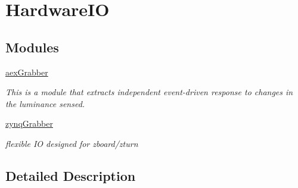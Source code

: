 \hypertarget{group__HardwareIO}{\section{Hardware\-I\-O}
\label{group__HardwareIO}
}
\subsection*{Modules}
\begin{DoxyCompactItemize}
\item 
\hyperlink{group__aexGrabber}{aex\-Grabber}
\begin{DoxyCompactList}\small\item\em This is a module that extracts independent event-\/driven response to changes in the luminance sensed. \end{DoxyCompactList}\item 
\hyperlink{group__zynqGrabber}{zynq\-Grabber}
\begin{DoxyCompactList}\small\item\em flexible I\-O designed for zboard/zturn \end{DoxyCompactList}\end{DoxyCompactItemize}


\subsection{Detailed Description}
